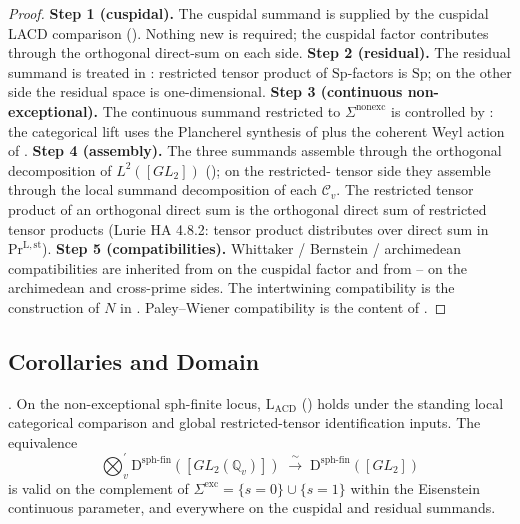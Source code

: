 \begin{proof}
\textbf{Step 1 (cuspidal).} The cuspidal summand is supplied by the cuspidal LACD comparison
(). Nothing new is
required; the cuspidal factor contributes through the orthogonal
direct-sum on each side.
\textbf{Step 2 (residual).} The residual summand is treated in
: restricted tensor product of
\(\mathrm{Sp}\)-factors is \(\mathrm{Sp}\); on the other side the
residual space is one-dimensional.
\textbf{Step 3 (continuous non-exceptional).} The continuous
summand restricted to \(\Sigma^{\mathrm{nonexc}}\) is controlled by
: the categorical lift uses the
Plancherel synthesis of  plus
the coherent Weyl action of .
\textbf{Step 4 (assembly).} The three summands assemble through
the orthogonal decomposition of \(L^{2}([GL_{2}])\)
(); on the restricted-
tensor side they assemble through the local summand decomposition
of each \(\mathcal{C}_{v}\). The restricted tensor product of an
orthogonal direct sum is the orthogonal direct sum of restricted
tensor products (Lurie HA 4.8.2: tensor product distributes over
direct sum in \(\mathrm{Pr}^{\mathrm{L,st}}\)).
\textbf{Step 5 (compatibilities).} Whittaker / Bernstein /
archimedean compatibilities are inherited from
 on the cuspidal factor and
from --
on the archimedean and cross-prime sides. The intertwining
compatibility is the construction of \(N\) in
. Paley--Wiener
compatibility is the content of .
\end{proof}

\subsection{Corollaries and Domain}

\begin{corollary}
\label{v4-arith:w6-d:cor:full-LACD-nonexc}
\ClaimStatusProvedHereConditional. On the non-exceptional sph-finite locus,
\(\mathrm{L}_{\mathrm{ACD}}\) () holds
under the standing local categorical comparison and global
restricted-tensor identification inputs. The equivalence
\begin{equation}
\bigotimes_{v}^{\prime}\mathrm{D}^{\mathrm{sph\text{-}fin}}([GL_{2}(\mathbb{Q}_{v})])\;\xrightarrow{\;\sim\;}\;\mathrm{D}^{\mathrm{sph\text{-}fin}}([GL_{2}])
\end{equation}
is valid on the complement of \(\Sigma^{\mathrm{exc}}=\{s=0\}\cup\{s=1\}\)
within the Eisenstein continuous parameter, and everywhere on the
cuspidal and residual summands.
\end{corollary}

